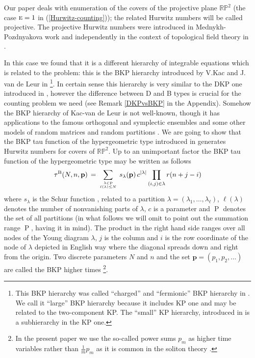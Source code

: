\documentclass[a4paper,10pt]{article}
\newcommand{\Pa}{\mathop\mathrm{P}\nolimits}
\newcommand{\bpow}{\mathbf{p}}
\theoremstyle{plain}
\theoremstyle{remark}
\def\be{\begin{equation}}
\def\ee{\end{equation}}
\begin{document}
Our paper deals with enumeration of the covers of the projective plane $\mathbb{RP}^2$ (the case $\textsc{e}=1$ in
(\ref{Hurwitz-counting}));
the related Hurwitz numbers will be called projective. The projective Hurwitz numbers were introduced
in Mednykh-Pozdnyakova work \cite{M2} and independently in the context
of topological field theory in \cite{AN}.

In this
case we found that
it is a different hierarchy of integrable equations which is related to the problem: this is the BKP hierarchy
introduced by V.Kac and J. van de Leur in \cite{KvdLbispec}\footnote{This BKP hierarchy was called ``charged'' and ``fermionic''
BKP hierarchy in \cite{KvdLbispec}. We call it ``large'' BKP hierarchy because it includes KP one and may be related
\cite{LeurO-2014} to the two-component KP. The ``small'' KP
hierarchy, introduced in \cite{JM} is a subhierarchy in the KP one.}. In certain sense this hierarchy is very similar to the
DKP one introduced in \cite{JM}, however the difference between D and B types is crucial for the counting problem
we need (see Remark \ref{DKPvsBKP} in the Appendix).
Somehow the BKP hierarchy of Kac-van de Leur is not well-known, though it has applications to the famous
orthogonal and symplectic ensembles \cite{L1} and some other models of random matrices
and random partitions \cite{OST-I, O-2012, LeurO-2014}.
We are going to show that the BKP tau function of the hypergeometric type introduced in \cite{OST-I} generates Hurwitz
numbers for covers of $\mathbb{RP}^2$. Up to an unimportant factor the BKP tau function of the hypergeometric type may be
written as follows
\be\label{BKP-hyp-tau}
\tau^{\rm B}(N,n,\bpow)\,=\,\sum_{\lambda\in\Pa\atop\ell(\lambda)\le N}\,s_\lambda(\bpow)\,
c^{|\lambda|}\prod_{(i,j)\in\lambda}r(n+j-i)
\ee
where $s_\lambda$ is the Schur function \cite{Mac}, related to a partition $\lambda=(\lambda_1,\dots,\lambda_{\ell})$,
$\ell(\lambda)$ denotes the number of nonvanishing parts of $\lambda$, $c$ is a parameter and
 $\Pa$ denotes the set of all partitions (in what follows we will omit to point out the summation range $\Pa$,
 having it in mind).
The product in the right hand side ranges over all nodes of the Young diagram $\lambda$, $j$ is the column and $i$ is the row
coordinate of the node of $\lambda$ depicted  in English way where the diagonal spreads down and right from the origin.
Two discrete parameters $N$ and $n$ and the set $\bpow=(p_1,p_2,\dots)$
are called the BKP higher times \cite{KvdLbispec}\footnote{ In the present paper we use the so-called power sums
$p_m$ \cite{Mac} as higher time variables rather than $\frac 1m p_m$ as it is common in the soliton theory \cite{JM}.}.
\end{document}
